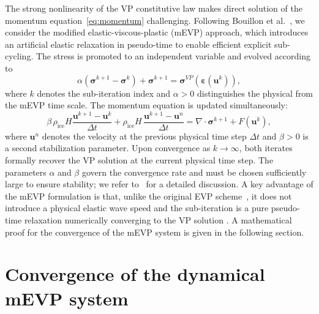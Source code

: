 \documentclass[11pt]{article}
\newcommand{\bu}{\mathbf{u}}
\newcommand{\sig}{\boldsymbol{\sigma}}
\newcommand{\beps}{\boldsymbol{\varepsilon}}
\begin{document}
The strong nonlinearity of the VP constitutive law makes direct solution of the momentum equation~\eqref{eq:momentum} challenging. Following Bouillon et al.~\cite{Bouillon2013}, we consider the modified elastic-viscous-plastic (mEVP) approach, which introduces an artificial elastic relaxation in pseudo-time to enable efficient explicit sub-cycling. The stress is promoted to an independent
variable and evolved according to
%
\begin{equation}
  \alpha \left(\sig^{k+1} - \sig^k\right)+ \sig^{k+1}
  = \sig^{VP}\!\left(\beps(\bu^k)\right),
  \label{eq:mevp_stress}
\end{equation}
%
where $k$ denotes the sub-iteration index and $\alpha > 0$ distinguishes the physical from the mEVP time scale. The momentum equation is updated simultaneously:
%
\begin{equation}
  \beta\,\rho_\text{ice}H\frac{\bu^{k+1} - \bu^k}{\Delta t}
  + \rho_{\mathrm{ice}} H\,\frac{\bu^{k+1} - \bu^n}{\Delta t}
  = \nabla \cdot \sig^{k+1} + F(\bu^k),
  \label{eq:mevp_momentum}
\end{equation}
%
where $\bu^n$ denotes the velocity at the previous physical time
step $\Delta t$ and $\beta > 0$ is a second stabilization parameter. Upon convergence as $k \to \infty$, both iterates formally recover the VP solution at the current physical time step. The parameters $\alpha$ and $\beta$ govern the convergence rate and must be chosen sufficiently large to ensure stability; we refer to~\cite{Bouillon2013,Kimmritz2016} for a detailed discussion. A key advantage of the mEVP formulation is that, unlike the original EVP scheme~\cite{HunkeDukowicz1997}, it does not introduce a physical elastic wave speed and the sub-iteration is a pure pseudo-time relaxation numerically converging to the VP solution \cite{kimmritz2015convergence}. A mathematical proof for the convergence of the mEVP system is given in the following section.


\section{Convergence of the dynamical mEVP system}
\end{document}
